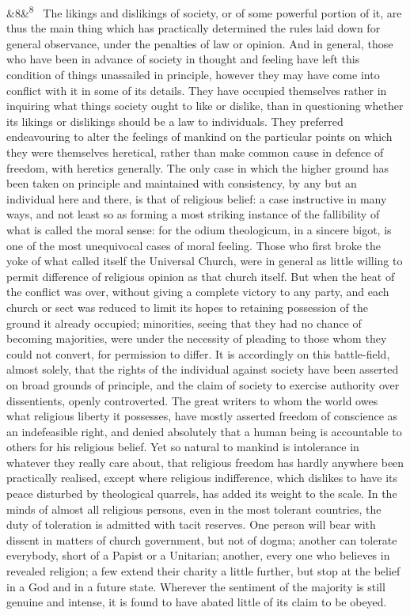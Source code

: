 \documentclass[12pt]{article}
\newcommand{\para}[1][]{\par\noindent\ifx&#1&\else\textsuperscript{\footnotesize #1}~\fi}
\begin{document}
\para[8] The likings and dislikings of society, or of some powerful portion of it, are thus the main thing which has practically determined the rules laid down for general observance, under the penalties of law or opinion. And in general, those who have been in advance of society in thought and feeling have left this condition of things unassailed in principle, however they may have come into conflict with it in some of its details. They have occupied themselves rather in inquiring what things society ought to like or dislike, than in questioning whether its likings or dislikings should be a law to individuals. They preferred endeavouring to alter the feelings of mankind on the particular points on which they were themselves heretical, rather than make common cause in defence of freedom, with heretics generally. The only case in which the higher ground has been taken on principle and maintained with consistency, by any but an individual here and there, is that of religious belief: a case instructive in many ways, and not least so as forming a most striking instance of the fallibility of what is called the moral sense: for the odium theologicum, in a sincere bigot, is one of the most unequivocal cases of moral feeling. Those who first broke the yoke of what called itself the Universal Church, were in general as little willing to permit difference of religious opinion as that church itself. But when the heat of the conflict was over, without giving a complete victory to any party, and each church or sect was reduced to limit its hopes to retaining possession of the ground it already occupied; minorities, seeing that they had no chance of becoming majorities, were under the necessity of pleading to those whom they could not convert, for permission to differ. It is accordingly on this battle-field, almost solely, that the rights of the individual against society have been asserted on broad grounds of principle, and the claim of society to exercise authority over dissentients, openly controverted. The great writers to whom the world owes what religious liberty it possesses, have mostly asserted freedom of conscience as an indefeasible right, and denied absolutely that a human being is accountable to others for his religious belief. Yet so natural to mankind is intolerance in whatever they really care about, that religious freedom has hardly anywhere been practically realised, except where religious indifference, which dislikes to have its peace disturbed by theological quarrels, has added its weight to the scale. In the minds of almost all religious persons, even in the most tolerant countries, the duty of toleration is admitted with tacit reserves. One person will bear with dissent in matters of church government, but not of dogma; another can tolerate everybody, short of a Papist or a Unitarian; another, every one who believes in revealed religion; a few extend their charity a little further, but stop at the belief in a God and in a future state. Wherever the sentiment of the majority is still genuine and intense, it is found to have abated little of its claim to be obeyed.
\end{document}
